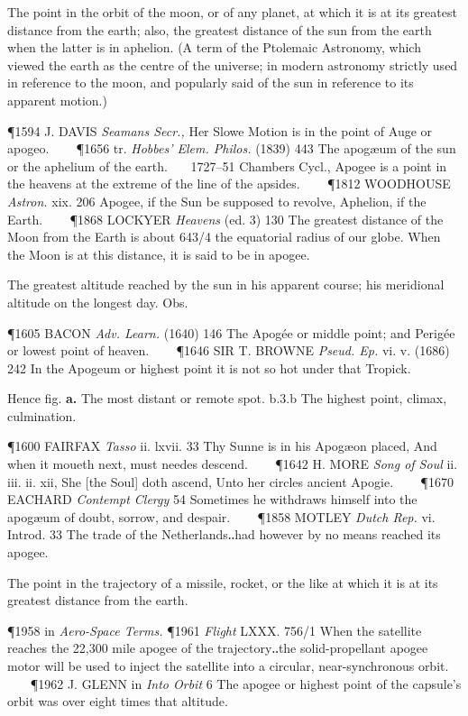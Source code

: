 \begin{description}[wide, labelwidth=!, labelindent=0pt]
\begin{myenumerate}

 The point in the orbit of the moon, or of any planet, at which it is at its greatest distance from the earth; also, the greatest distance of the sun from the earth when the latter is in aphelion. (A term of the Ptolemaic Astronomy, which viewed the earth as the centre of the universe; in modern astronomy strictly used in reference to the moon, and popularly said of the sun in reference to its apparent motion.)

\P 1594 J. DAVIS  \textit{Seamans Secr.,} Her Slowe Motion is in the point of Auge or apogeo.    
\P 1656 tr.  \textit{Hobbes' Elem. Philos.} (1839) 443 The apogæum of the sun or the aphelium of the earth.    1727–51 Chambers Cycl., Apogee is a point in the heavens at the extreme of the line of the apsides.    
\P 1812 WOODHOUSE  \textit{Astron.} xix. 206 Apogee, if the Sun be supposed to revolve, Aphelion, if the Earth.    
\P 1868 LOCKYER  \textit{Heavens} (ed. 3) 130 The greatest distance of the Moon from the Earth is about 643/4 the equatorial radius of our globe. When the Moon is at this distance, it is said to be in apogee.

 The greatest altitude reached by the sun in his apparent course; his meridional altitude on the longest day. Obs.

\P 1605 BACON  \textit{Adv. Learn.} (1640) 146 The Apogée or middle point; and Perigée or lowest point of heaven.    
\P 1646 SIR T. BROWNE  \textit{Pseud. Ep.} vi. v. (1686) 242 In the Apogeum or highest point it is not so hot under that Tropick.

 Hence fig. \textbf{a.} The most distant or remote spot. b.3.b The highest point, climax, culmination.

\P 1600 FAIRFAX  \textit{Tasso} ii. lxvii. 33 Thy Sunne is in his Apogæon placed, And when it moueth next, must needes descend.    
\P 1642 H. MORE  \textit{Song of Soul} ii. iii. ii. xii, She [the Soul] doth ascend, Unto her circles ancient Apogie.    
\P 1670 EACHARD  \textit{Contempt Clergy} 54 Sometimes he withdraws himself into the apogæum of doubt, sorrow, and despair.    
\P 1858 MOTLEY  \textit{Dutch Rep.} vi. Introd. 33 The trade of the Netherlands‥had however by no means reached its apogee.

 The point in the trajectory of a missile, rocket, or the like at which it is at its greatest distance from the earth.

\P 1958 in \textit{Aero-Space Terms.}
\P 1961 \textit{Flight}  LXXX. 756/1 When the satellite reaches the 22,300 mile apogee of the trajectory‥the solid-propellant apogee motor will be used to inject the satellite into a circular, near-synchronous orbit.    
\P 1962 J. GLENN in \textit{Into Orbit} 6 The apogee or highest point of the capsule's orbit was over eight times that altitude.
\end{myenumerate}



\end{description}
